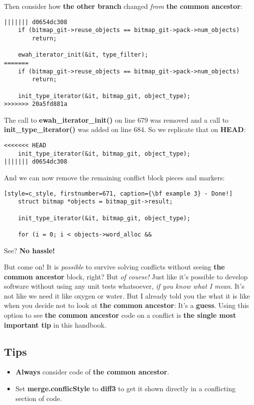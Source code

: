 Then consider how {\bf the other branch} changed {\it from} {\bf the common ancestor}:

\begin{lstlisting}[style=c_style, firstnumber=675, caption={\bf example 3} - step 2]
||||||| d0654dc308
	if (bitmap_git->reuse_objects == bitmap_git->pack->num_objects)
		return;

	ewah_iterator_init(&it, type_filter);
=======
	if (bitmap_git->reuse_objects == bitmap_git->pack->num_objects)
		return;

	init_type_iterator(&it, bitmap_git, object_type);
>>>>>>> 20a5fd881a
\end{lstlisting}

The call to {\bf ewah\_iterator\_init()} on line 679 was removed and a call to {\bf init\_type\_iterator()} was added on line 684.
So we replicate that on {\bf HEAD}:

\begin{lstlisting}[style=c_style, firstnumber=673, caption={\bf example 3} - step 3]
<<<<<<< HEAD
	init_type_iterator(&it, bitmap_git, object_type);
||||||| d0654dc308
\end{lstlisting}

And we can now remove the remaining conflict block pieces and markers:

\begin{lstlisting}[style=c_style, firstnumber=671, caption={\bf example 3} - Done!]
	struct bitmap *objects = bitmap_git->result;

	init_type_iterator(&it, bitmap_git, object_type);

	for (i = 0; i < objects->word_alloc &&
\end{lstlisting}

See? {\bf No hassle!}

But come on! It is {\it possible} to survive solving conflicts without seeing {\bf the common ancestor} block, right?
But {\it of course!} Just like it's possible to develop software without using any unit tests whatsoever,
{\it if you know what I mean}. It's not like we need it like oxygen or water. But I already told you the what it is
like when you decide not to look at {\bf the common ancestor}: It's a {\bf guess}. Using this option to see
{\bf the common ancestor} code on a conflict is {\bf the single most important tip} in this handbook.

\subsection{Tips}
\begin{itemize}
	\item {\bf Always} consider code of {\bf the common ancestor}.
	\item Set {\bf merge.conflicStyle} to {\bf diff3} to get it shown directly in a conflicting section of code.
\end{itemize}

